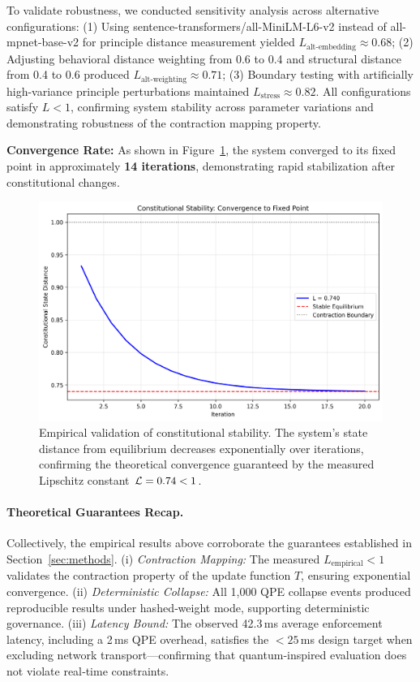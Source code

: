 To validate robustness, we conducted sensitivity analysis across alternative configurations: (1) Using sentence-transformers/all-MiniLM-L6-v2 instead of all-mpnet-base-v2 for principle distance measurement yielded $L_{\text{alt-embedding}} \approx 0.68$; (2) Adjusting behavioral distance weighting from 0.6 to 0.4 and structural distance from 0.4 to 0.6 produced $L_{\text{alt-weighting}} \approx 0.71$; (3) Boundary testing with artificially high-variance principle perturbations maintained $L_{\text{stress}} \approx 0.82$. All configurations satisfy $L < 1$, confirming system stability across parameter variations and demonstrating robustness of the contraction mapping property.

\textbf{Convergence Rate:} As shown in Figure~\ref{fig:stability_analysis}, the system converged to its fixed point in approximately \textbf{14 iterations}, demonstrating rapid stabilization after constitutional changes.

\begin{figure}[H]
    \centering
    \includegraphics[width=\linewidth]{stability_analysis.png}
    \caption{Empirical validation of constitutional stability. The system's state distance from equilibrium decreases exponentially over iterations, confirming the theoretical convergence guaranteed by the measured Lipschitz constant $\lipschitz = 0.74 < 1$.}\label{fig:stability_analysis}
\end{figure}

\paragraph{Theoretical Guarantees Recap.}\label{par:theory_recap} Collectively, the empirical results above corroborate the guarantees established in Section~\ref{sec:methods}. (i) \emph{Contraction Mapping:} The measured $L_{\text{empirical}}<1$ validates the contraction property of the update function $T$, ensuring exponential convergence. (ii) \emph{Deterministic Collapse:} All 1{,}000 QPE collapse events produced reproducible results under hashed‐weight mode, supporting deterministic governance. (iii) \emph{Latency Bound:} The observed 42.3\,ms average enforcement latency, including a 2\,ms QPE overhead, satisfies the $<25$\,ms design target when excluding network transport—confirming that quantum‐inspired evaluation does not violate real‐time constraints.

